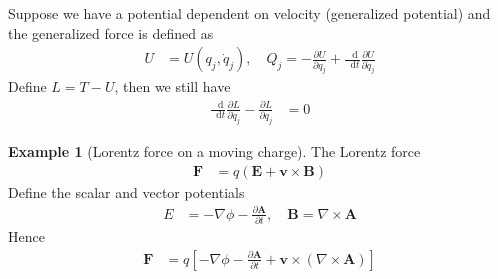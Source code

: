 \documentclass[twoside,11pt]{article}
\numberwithin{equation}{section} %
\newcommand{\lms}{\fontfamily{lmss}\selectfont} %
\renewcommand*\d{\mathop{}\!\mathrm{d}}
\theoremstyle{definition}
\newtheorem{example}{\lms Example}[section]
\theoremstyle{remark}
\begin{document}
Suppose we have a potential dependent on velocity (generalized potential)
and the generalized force is defined as
\begin{align}
    U &= U(q_j,\dot{q}_j), \quad
    Q_j = -\frac{\partial U}{\partial q_j} 
    + \frac{\d }{\d t}\frac{\partial U}{\partial\dot{q}_j}
\end{align}
Define $L = T-U$, then we still have
\begin{align}
    \frac{\d }{\d t}\frac{\partial L}{\partial \dot{q}_j} - \frac{\partial L}{\partial q_j} &= 0
\end{align}
\begin{example}[Lorentz force on a moving charge]
The Lorentz force
\begin{align*}
    \mathbf{F} &= 
    q(\mathbf{E} + \mathbf{v}\times\mathbf{B})
\end{align*}
Define the scalar and vector potentials
\begin{align*}
    E &= -\nabla\phi - \frac{\partial \mathbf{A}}{\partial t},\quad
    \mathbf{B} = \nabla\times\mathbf{A}
\end{align*}
Hence
\begin{align*}
    \mathbf{F} &= 
    q\left[
        -\nabla\phi - \frac{\partial \mathbf{A}}{\partial t}
        + \mathbf{v}\times(\nabla\times\mathbf{A})
    \right]
\end{align*}

\end{example}
\end{document}
